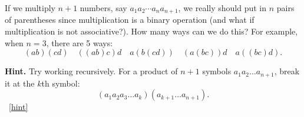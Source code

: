 \documentclass{book}
\begin{document}
\setcounter{project}{175}
\addtocounter{project}{-1}
\begin{activity}[]\label{act-parenthesize}
\hypertarget{p-1039}{}%
If we multiply \(n+1\) numbers, say \(a_1a_2\cdots a_n a_{n+1}\), we really should put in \(n\) pairs of parentheses since multiplication is a binary operation (and what if multiplication is not associative?).  How many ways can we do this?  For example, when \(n = 3\), there are 5 ways:%
\begin{equation*}
(ab)(cd)\quad ((ab)c)d \quad a(b(cd)) \quad (a(bc))d \quad a((bc)d).
\end{equation*}
%
\par\smallskip%
\noindent\textbf{Hint.}\hypertarget{hint-114}{}\quad%
\hypertarget{p-1040}{}%
Try working recursively.   For a product of \(n+1\) symbols \(a_{1}a_{2}\ldots a_{n+1}\), break it at the \(k\)th symbol:%
\begin{equation*}
(a_{1}a_{2}a_{3}\ldots a_{k})(a_{k + 1}\ldots a_{n+1}).
\end{equation*}
%
~\hfill{\tiny\hyperlink{a-175}{[hint]}\hypertarget{q-175}{}}\end{activity}
\end{document}
